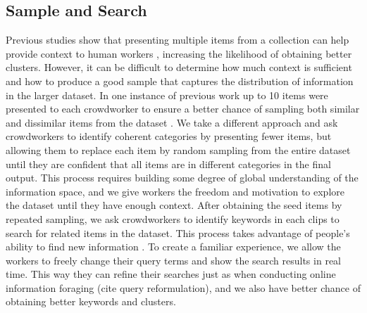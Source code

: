 \subsection{Sample and Search}
Previous studies show that presenting multiple items from a collection can help
provide context to human workers \cite{medlin1978}, increasing the likelihood
of obtaining better clusters.  However, it can be difficult to determine how
much context is sufficient and how to produce a good sample that captures the distribution of information in the larger dataset. 
In one instance of previous work up to 10 items were presented to each
crowdworker to ensure a better chance of sampling both
similar and dissimilar items from the dataset \cite{andre2014crowd}.
We take a different approach and ask crowdworkers to identify coherent categories by
presenting fewer items, but allowing them to replace each item by random sampling
from the entire dataset until they are confident that all items are in different
categories in the final output.
This process requires building some degree of global understanding of the
information space, and we give workers the freedom and motivation to explore the
dataset until they have enough context. After obtaining the seed items by repeated sampling,
we ask crowdworkers to identify keywords in each clips to search for related items in the dataset.
This process takes advantage of people's ability to find new information \cite{pirolli1999information}. To create a familiar experience, we allow the workers to freely change their query terms and show the search results in real time. This way they can refine their searches just as when conducting online information foraging (cite query reformulation), and we also have better chance of obtaining better keywords and clusters.



